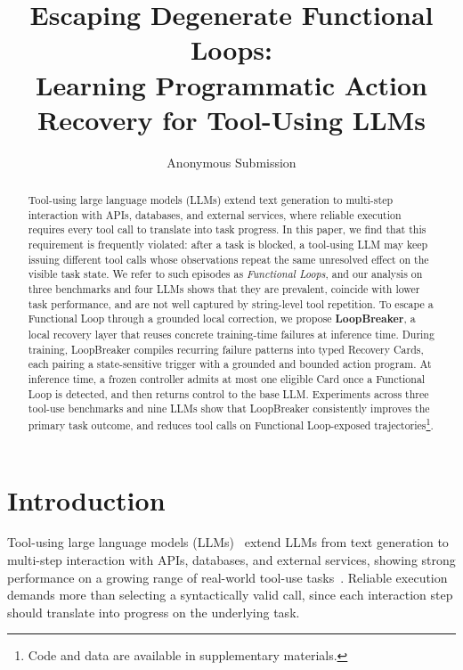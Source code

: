 \documentclass[letterpaper]{article}
\title{Escaping Degenerate Functional Loops:\\ Learning Programmatic Action Recovery for Tool-Using LLMs}
\author{Anonymous Submission}
\begin{document}
\maketitle

\begin{abstract}
Tool-using large language models (LLMs) extend text generation to multi-step interaction with APIs, databases, and external services, where reliable execution requires every tool call to translate into task progress. In this paper, we find that this requirement is frequently violated: after a task is blocked, a tool-using LLM may keep issuing different tool calls whose observations repeat the same unresolved effect on the visible task state. We refer to such episodes as \emph{Functional Loops}, and our analysis on three benchmarks and four LLMs shows that they are prevalent, coincide with lower task performance, and are not well captured by string-level tool repetition. To escape a Functional Loop through a grounded local correction, we propose \textbf{LoopBreaker}, a local recovery layer that reuses concrete training-time failures at inference time. During training, LoopBreaker compiles recurring failure patterns into typed Recovery Cards, each pairing a state-sensitive trigger with a grounded and bounded action program. At inference time, a frozen controller admits at most one eligible Card once a Functional Loop is detected, and then returns control to the base LLM. Experiments across three tool-use benchmarks and nine LLMs show that LoopBreaker consistently improves the primary task outcome, and reduces tool calls on Functional Loop-exposed trajectories\footnote{Code and data are available in supplementary materials.}.
\end{abstract}

\section{Introduction}

Tool-using large language models (LLMs)~\citep{yao2023react,schick2023toolformer,qin2023toollm} extend LLMs from text generation to multi-step interaction with APIs, databases, and external services, showing strong performance on a growing range of real-world tool-use tasks~\citep{yao2024taubench,barres2025tau2bench,trivedi2024appworld,lu2025toolsandbox,chen2025acebench,he2026vitabench}. Reliable execution demands more than selecting a syntactically valid call, since each interaction step should translate into progress on the underlying task.
\end{document}
